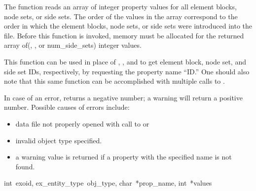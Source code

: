 The function  reads an array of integer
property values for all element blocks, node sets, or side sets. The
order of the values in the array correspond to the order in which the
element blocks, node sets, or side sets were introduced into the
file. Before this function is invoked, memory must be allocated for
the returned array of(, , or
{num_side_sets}) integer values.


This function can be used in place of
,
, and
to get element block, node set, and side set IDs, respectively, by
requesting the property name ``ID.'' One should also note that this
same function can be accomplished with multiple calls to
.

In case of an error,  returns a negative
number; a warning will return a positive number.  Possible causes of
errors include:


\begin{itemize}
 \item data file not properly opened with call to 
 or 

 \item invalid object type specified.

 \item a warning value is returned if a property with the specified
 name is not found.
\end{itemize}


{int~exoid,
ex_entity_type~obj_type,
char~*prop_name,
int~*values}

